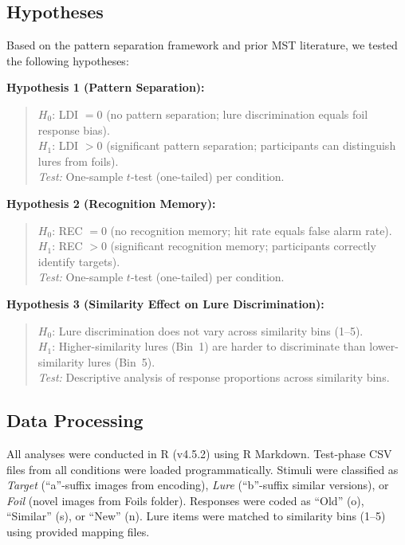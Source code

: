 \documentclass[12pt]{article}
\begin{document}
\subsection{Hypotheses}

Based on the pattern separation framework and prior MST literature, we tested the following hypotheses:

\textbf{Hypothesis 1 (Pattern Separation):}
\begin{quote}
$H_0$: LDI $= 0$ (no pattern separation; lure discrimination equals foil response bias).\\
$H_1$: LDI $> 0$ (significant pattern separation; participants can distinguish lures from foils).\\
\textit{Test:} One-sample $t$-test (one-tailed) per condition.
\end{quote}

\newpage
\textbf{Hypothesis 2 (Recognition Memory):}
\begin{quote}
$H_0$: REC $= 0$ (no recognition memory; hit rate equals false alarm rate).\\
$H_1$: REC $> 0$ (significant recognition memory; participants correctly identify targets).\\
\textit{Test:} One-sample $t$-test (one-tailed) per condition.
\end{quote}

\textbf{Hypothesis 3 (Similarity Effect on Lure Discrimination):}
\begin{quote}
$H_0$: Lure discrimination does not vary across similarity bins (1--5).\\
$H_1$: Higher-similarity lures (Bin~1) are harder to discriminate than lower-similarity lures (Bin~5).\\
\textit{Test:} Descriptive analysis of response proportions across similarity bins.
\end{quote}

\subsection{Data Processing}

All analyses were conducted in R (v4.5.2) using R Markdown. Test-phase CSV files from all conditions were loaded programmatically. Stimuli were classified as \textit{Target} (``a''-suffix images from encoding), \textit{Lure} (``b''-suffix similar versions), or \textit{Foil} (novel images from Foils folder). Responses were coded as ``Old'' (o), ``Similar'' (s), or ``New'' (n). Lure items were matched to similarity bins (1--5) using provided mapping files.
\end{document}
